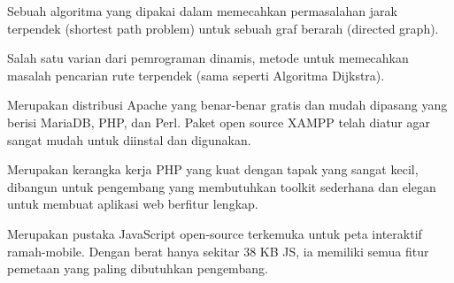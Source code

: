 Sebuah algoritma yang dipakai dalam memecahkan permasalahan jarak terpendek (shortest path problem) untuk sebuah graf berarah (directed graph).

Salah satu varian dari pemrograman dinamis, metode untuk memecahkan masalah pencarian rute terpendek (sama seperti Algoritma Dijkstra). 

Merupakan distribusi Apache yang benar-benar gratis dan mudah dipasang yang berisi MariaDB, PHP, dan Perl. Paket open source XAMPP telah diatur agar sangat mudah untuk diinstal dan digunakan.

Merupakan kerangka kerja PHP yang kuat dengan tapak yang sangat kecil, dibangun untuk pengembang yang membutuhkan toolkit sederhana dan elegan untuk membuat aplikasi web berfitur lengkap.

Merupakan pustaka JavaScript open-source terkemuka untuk peta interaktif ramah-mobile. Dengan berat hanya sekitar 38 KB JS, ia memiliki semua fitur pemetaan yang paling dibutuhkan pengembang.



